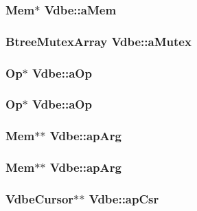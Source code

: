 \subsubsection{\setlength{\rightskip}{0pt plus 5cm}\bf{Mem}$\ast$ \bf{Vdbe::a\-Mem}}\label{structVdbe_f2c55e397fd5e07b8c65b32eebeccaba}


\subsubsection{\setlength{\rightskip}{0pt plus 5cm}\bf{Btree\-Mutex\-Array} \bf{Vdbe::a\-Mutex}}\label{structVdbe_12631defbed466652a086c8e696eea66}


\subsubsection{\setlength{\rightskip}{0pt plus 5cm}\bf{Op}$\ast$ \bf{Vdbe::a\-Op}}\label{structVdbe_52539ac78ef4f93dc4aefee0d88184b8}


\subsubsection{\setlength{\rightskip}{0pt plus 5cm}\bf{Op}$\ast$ \bf{Vdbe::a\-Op}}\label{structVdbe_52539ac78ef4f93dc4aefee0d88184b8}


\subsubsection{\setlength{\rightskip}{0pt plus 5cm}\bf{Mem}$\ast$$\ast$ \bf{Vdbe::ap\-Arg}}\label{structVdbe_3cba86d65cecfdf3da18fc9cc1e71316}


\subsubsection{\setlength{\rightskip}{0pt plus 5cm}\bf{Mem}$\ast$$\ast$ \bf{Vdbe::ap\-Arg}}\label{structVdbe_3cba86d65cecfdf3da18fc9cc1e71316}


\subsubsection{\setlength{\rightskip}{0pt plus 5cm}\bf{Vdbe\-Cursor}$\ast$$\ast$ \bf{Vdbe::ap\-Csr}}\label{structVdbe_02848559849d96b3871290686c9617f2}


